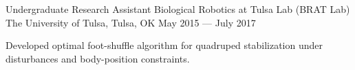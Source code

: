 \begin{cventries}
  \cventry
    {Undergraduate Research Assistant} %
    {Biological Robotics at Tulsa Lab (BRAT Lab)} %
    {The University of Tulsa, Tulsa, OK} %
    {May 2015 --- July 2017} %
    {
      \begin{cvitems} %
        \item {Developed optimal foot-shuffle algorithm for quadruped stabilization under disturbances and body-position constraints.}
      \end{cvitems}
    }






\end{cventries}